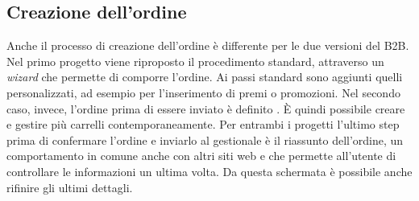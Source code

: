 \subsection{Creazione dell'ordine}
Anche il processo di creazione dell'ordine è differente per le due versioni del B2B. Nel primo progetto viene riproposto il procedimento standard, attraverso un \textit{wizard} che permette di comporre l'ordine. Ai passi standard sono aggiunti quelli personalizzati, ad esempio per l'inserimento di premi o promozioni. Nel secondo caso, invece, l'ordine prima di essere inviato è definito . È quindi possibile creare e gestire più carrelli contemporaneamente. Per entrambi i progetti l'ultimo step prima di confermare l'ordine e inviarlo al gestionale è il riassunto dell'ordine, un comportamento in comune anche con altri siti web e che permette all'utente di controllare le informazioni un ultima volta. Da questa schermata è possibile anche rifinire gli ultimi dettagli.

